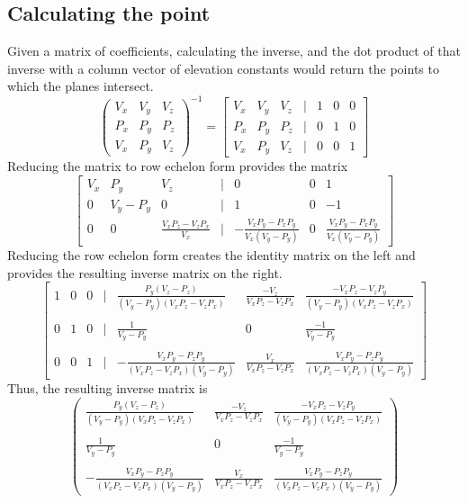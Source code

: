 \documentclass[a4paper, 12pt]{article}
\begin{document}
\subsection{Calculating the point}
Given a matrix of coefficients, calculating the inverse, and the dot product of that inverse with a column vector of elevation constants would return the points to which the planes intersect.
$$\begin{pmatrix}
	V_x & V_y & V_z \\
	P_x & P_y & P_z \\
	V_x & P_y & V_z
\end{pmatrix}^{-1} = 
\begin{bmatrix}
	V_x & V_y & V_z & | & 1 & 0 	& 0 \\
	P_x & P_y & P_z & | & 0 & 1 & 0 \\
	V_x & P_y & V_z & | & 0 & 0 & 1
\end{bmatrix}
$$
Reducing the matrix to row echelon form provides the matrix
$$
\begin{bmatrix}
	V_x & P_y & V_z & | & 0 & 0 	& 1 \\
	0 & V_y - P_y & 0 & | & 1 & 0 & -1 \\
	0 & 0 & \frac{V_xP_z - V_zP_x}{V_x} & | & -\frac{V_xP_y - P_xP_y}{V_x(V_y-P_y)} & 0 & \frac{V_xP_y - P_xP_y}{V_x(V_y-P_y)}
\end{bmatrix}
$$
Reducing the row echelon form creates the identity matrix on the left and provides the resulting inverse matrix on the right.
$$
\begin{bmatrix}
1 & 0 & 0 & | & \frac{P_y(V_z - P_z)}{(V_y-P_y)(V_xP_z-V_zP_x)} & \frac{-V_z}{V_xP_z-V_zP_x} & \frac{-V_xP_z - V_zP_y}{(V_y-P_y)(V_xP_z-V_zP_x)} \\\\
0 & 1 & 0 & | & \frac{1}{V_y-P_y} & 0 & \frac{-1}{V_y-P_y} \\\\
0 & 0 & 1 & | & -\frac{V_xP_y - P_zP_y}{(V_xP_z-V_zP_x)(V_y-P_y)} & \frac{V_x}{V_xP_z-V_zP_x} & \frac{V_xP_y - P_zP_y}{(V_xP_z-V_zP_x)(V_y-P_y)}
\end{bmatrix}
$$
Thus, the resulting inverse matrix is
$$
\begin{pmatrix}
\frac{P_y(V_z - P_z)}{(V_y-P_y)(V_xP_z-V_zP_x)} & \frac{-V_z}{V_xP_z-V_zP_x} & \frac{-V_xP_z - V_zP_y}{(V_y-P_y)(V_xP_z-V_zP_x)} \\\\
\frac{1}{V_y-P_y} & 0 & \frac{-1}{V_y-P_y} \\\\
-\frac{V_xP_y - P_zP_y}{(V_xP_z-V_zP_x)(V_y-P_y)} & \frac{V_x}{V_xP_z-V_zP_x} & \frac{V_xP_y - P_zP_y}{(V_xP_z-V_zP_x)(V_y-P_y)}
\end{pmatrix}
$$
\end{document}
